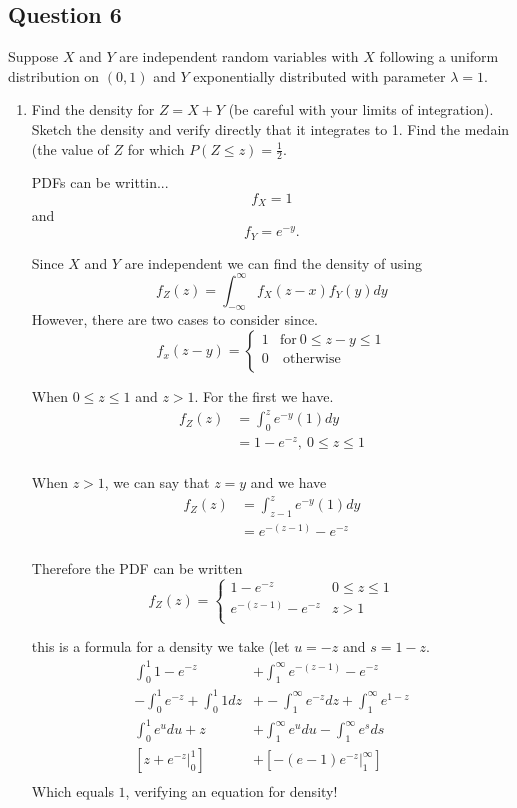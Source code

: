 \documentclass{tufte-book}
\theoremstyle{mytheoremstyle}
\theoremstyle{mylemstyle}
\theoremstyle{mydefstyle}
\begin{document}
\subsection{Question 6}
Suppose $X$ and $Y$ are independent random variables with $X$ following a uniform distribution on $(0,1)$ and $Y$ exponentially distributed with parameter $\lambda=1$.

\begin{enumerate}

\item Find the density for $Z=X+Y$ (be careful with your limits of integration).  Sketch the density and verify directly that it integrates to 1.  Find the medain (the value of $Z$ for which $P(Z\leq z) = \frac{1}{2}$.

 PDFs can be writtin...
\[ f_X = 1 \]
and
\[ f_Y=e^{-y}.\]

Since $X$ and $Y$ are independent we can find the density of using
\[ f_Z(z) = \int_{-\infty}^{\infty}f_X(z-x)f_Y(y)dy \]
However, there are two cases to consider since.
\[ f_x(z-y)=
\begin{cases}
        1  & \text{for}\ 0 \leq z-y \leq 1\\
        0 & \ \text{otherwise}\\
\end{cases}
\]

When $0 \leq z \leq 1$ and $z>1$.   For the first we have.
\begin{align*}
f_Z(z) &= \int_0^z e^{-y}(1)dy\\
&= 1-e^{-z} ,\ 0\leq z \leq 1\\
\end{align*}

When $z>1$, we can say that $z=y$ and we have
\begin{align*}
f_Z(z) &= \int_{z-1}^z e^{-y}(1)dy\\
&= e^{-(z-1)}-e^{-z}\\
\end{align*}

Therefore the PDF can be written
\[f_Z(z) =
\begin{cases}
    1-e^{-z} & 0 \leq z \leq 1\\
    e^{-(z-1)}-e^{-z} & z>1\\
\end{cases}
\]

 this is a formula for a density we take (let $u=-z$ and $s=1-z$.
\begin{align*}
\int_0^1  1-e^{-z}  &+ \int_{1}^\infty e^{-(z-1)}-e^{-z}\\
-\int_0^1 e^{-z} +\int_0^1 1dz &+ -\int_1^\infty e^{-z}dz + \int_1^\infty e^{1-z}\\
\int_0^1 e^udu + z &+ \int_1^\infty e^{u}du - \int_1^\infty e^{s}ds \\
[z+ e^{-z}\Big|_0^1] &+ [-(e-1)e^{-z}\Big|_1^\infty]\\
\end{align*}
Which equals $1$, verifying an equation for density!


\end{enumerate}
\end{document}

